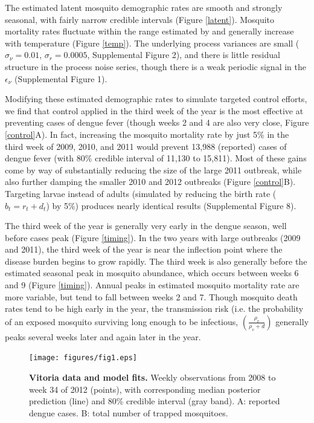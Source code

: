 \documentclass[10pt,letterpaper]{article}
\begin{document}
The estimated latent mosquito demographic rates are smooth and strongly seasonal, with fairly narrow credible intervals (Figure \ref{latent}).
Mosquito mortality rates fluctuate within the range estimated by \cite{Brady2013} and generally increase with temperature (Figure \ref{temp}).
The underlying process variances are small ($\sigma_{\nu} = 0.01$, $\sigma_r = 0.0005$, Supplemental Figure 2), and there is little residual structure in the process noise series, though there is a weak periodic signal in the $\epsilon_{\nu}$ (Supplemental Figure 1).

Modifying these estimated demographic rates to simulate targeted control efforts, we find that control applied in the third week of the year is the most effective at preventing cases of dengue fever (though weeks 2 and 4 are also very close, Figure \ref{control}A).
In fact, increasing the mosquito mortality rate by just 5\% in the third week of 2009, 2010, and 2011 would prevent 13,988 (reported) cases of dengue fever (with 80\% credible interval of 11,130 to 15,811).
Most of these gains come by way of substantially reducing the size of the large 2011 outbreak, while also further damping the smaller 2010 and 2012 outbreaks (Figure \ref{control}B).
Targeting larvae instead of adults (simulated by reducing the birth rate ($b_t = r_t + d_t$) by 5\%) produces nearly identical results (Supplemental Figure 8).

The third week of the year is generally very early in the dengue season, well before cases peak (Figure \ref{timing}).
In the two years with large outbreaks (2009 and 2011), the third week of the year is near the inflection point where the disease burden begins to grow rapidly.  
The third week is also generally before the estimated seasonal peak in mosquito abundance, which occurs between weeks 6 and 9 (Figure \ref{timing}).
Annual peaks in estimated mosquito mortality rate are more variable, but tend to fall between weeks 2 and 7.
Though mosquito death rates tend to be high early in the year, the transmission risk (i.e. the probability of an exposed mosquito surviving long enough to be infectious, $\left(\frac{\rho_v}{\rho_v + d}\right)$ generally peaks several weeks later and again later in the year.

\begin{figure}[!h]
\texttt{[image: figures/fig1.eps]}
\caption{{\bf Vitoria data and model fits.}
Weekly observations from 2008 to week 34 of 2012 (points), with corresponding median posterior prediction (line) and 80\% credible interval (gray band). A: reported dengue cases. B: total number of trapped mosquitoes.
}
\label{timeseries}
\end{figure}
\end{document}
